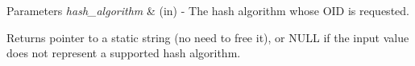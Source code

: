 \begin{DoxyParams}{Parameters}
{\em hash\_\-algorithm} & {\ttfamily }(in) -\/ The hash algorithm whose OID is requested. \\
\hline
\end{DoxyParams}
\begin{DoxyReturn}{Returns}
pointer to a static string (no need to free it), or NULL if the input value does not represent a supported hash algorithm. 
\end{DoxyReturn}
